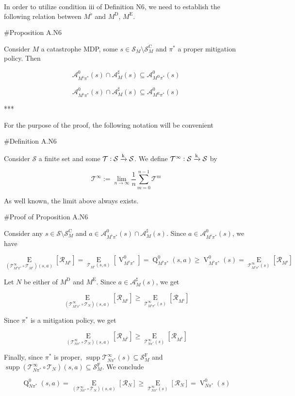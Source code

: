 \documentclass[a4paper]{article}
\DeclareMathOperator{\Supp}{supp}
\newcommand{\AP}[1]{\left(#1\right)}
\newcommand{\AB}[1]{\left[#1\right]}
\newcommand{\Ea}[2]{\underset{#1}{\operatorname{E}}\AB{#2}}
\newcommand{\M}{\xrightarrow{\textnormal{k}}}
\newcommand{\A}{\mathcal{A}}
\newcommand{\St}{\mathcal{S}}
\newcommand{\T}{\mathcal{T}}
\newcommand{\R}{\mathcal{R}}
\newcommand{\RMC}{\mathrm{C}}
\newcommand{\RMD}{\mathrm{D}}
\newcommand{\RME}{\mathrm{E}}
\newcommand{\RMF}{\mathrm{F}}
\newcommand{\SF}{\St^{\RMF}}
\newcommand{\SC}{\St^{\RMC}}
\newcommand{\MD}{M^{\RMD}}
\newcommand{\ME}{M^{\RME}}
\newcommand{\V}{\operatorname{V}}
\newcommand{\Q}{\operatorname{Q}}
\begin{document}
In order to utilize condition iii of Definition N6, we need to establish the following relation between $M^\flat$ and $\MD$, $\ME$.

\#Proposition A.N6

Consider $M$ a catastrophe MDP, some $s \in \St_M \setminus \SC_M$ and $\pi^*$ a proper mitigation policy. Then

$$\A_{M^\flat\pi^*}^0\AP{s} \cap \A_M^\sharp(s) \subseteq \A_{\MD\pi^*}^0\AP{s}$$

$$\A_{M^\flat\pi^*}^0\AP{s} \cap \A_M^\sharp(s) \subseteq \A_{\ME\pi^*}^0\AP{s}$$

***

For the purpose of the proof, the following notation will be convenient

\#Definition A.N6

Consider $\St$ a finite set and some $\T: \St \M \St$. We define $\T^\infty: \St \M \St$ by

$$\T^\infty := \lim_{n \rightarrow \infty} \frac{1}{n} \sum_{m = 0}^{n-1} \T^m$$

As well known, the limit above always exists.

\#Proof of Proposition A.N6

Consider any $s \in \St \setminus \SC_M$ and $a \in \A_{M^\flat\pi^*}^0\AP{s} \cap \A_M^\sharp(s)$. Since $a \in \A_{M^\flat\pi^*}^0\AP{s}$, we have

$$\Ea{\AP{\T_{M^\flat\pi^*}^\infty \circ \T_{M^\flat}}(s,a)}{\R_{M^\flat}} = \Ea{\T_{M^\flat}(s,a)}{\V^0_{M^\flat\pi^*}} = \Q_{M^\flat\pi^*}^0(s,a) \geq \V_{M^\flat\pi^*}^0(s) = \Ea{\T_{M^\flat\pi^*}^\infty(s)}{\R_{M^\flat}}$$

Let $N$ be either of $\MD$ and $\ME$. Since $a \in \A_M^\sharp(s)$, we get

$$\Ea{\AP{\T_{M^\flat\pi^*}^\infty \circ \T_{N}}(s,a)}{\R_{M^\flat}} \geq \Ea{\T_{M^\flat\pi^*}^\infty(s)}{\R_{M^\flat}}$$

Since $\pi^*$ is a mitigation policy, we get

$$\Ea{\AP{\T_{N\pi^*}^\infty \circ \T_{N}}(s,a)}{\R_{M^\flat}} \geq \Ea{\T_{N\pi^*}^\infty(s)}{\R_{M^\flat}}$$

Finally, since $\pi^*$ is proper, $\Supp{\T_{N\pi^*}^\infty(s)} \subseteq \SF_M$ and $\Supp{\AP{\T_{N\pi^*}^\infty \circ \T_{N}}(s,a)} \subseteq \SF_M$. We conclude

$$\Q_{N\pi^*}^0(s,a) = \Ea{\AP{\T_{N\pi^*}^\infty \circ \T_{N}}(s,a)}{\R_{N}} \geq \Ea{\T_{N\pi^*}^\infty(s)}{\R_{N}} = \V_{N\pi^*}^0(s)$$
\end{document}
